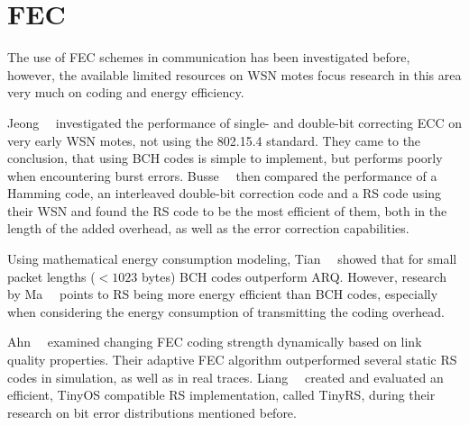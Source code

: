 \section{\acl{FEC}}

The use of \ac{FEC} schemes in communication has been investigated before, however, the available limited resources on \ac{WSN} motes focus research in this area very much on coding and energy efficiency.

Jeong~\etal~\cite{Jeong2003} investigated the performance of single- and double-bit correcting \ac{ECC} on very early \ac{WSN} motes, not using the 802.15.4 standard.
They came to the conclusion, that using \ac{BCH} codes is simple to implement, but performs poorly when encountering burst errors.
Busse~\etal~\cite{Busse2006} then compared the performance of a Hamming code, an interleaved double-bit correction code and a \ac{RS} code using their \ac{WSN} and found the \ac{RS} code to be the most efficient of them, both in the length of the added overhead, as well as the error correction capabilities.

Using mathematical energy consumption modeling, Tian~\etal~\cite{Tian2008} showed that for small packet lengths ($<1023$ bytes) \ac{BCH} codes outperform \ac{ARQ}.
However, research by Ma~\etal~\cite{Ma2009} points to \ac{RS} being more energy efficient than \ac{BCH} codes, especially when considering the energy consumption of transmitting the coding overhead.

Ahn~\etal~\cite{Ahn2005} examined changing \ac{FEC} coding strength dynamically based on link quality properties.
Their adaptive \ac{FEC} algorithm outperformed several static \ac{RS} codes in simulation, as well as in real traces.
Liang~\etal~\cite{Liang2010} created and evaluated an efficient, TinyOS compatible \ac{RS} implementation, called TinyRS, during their research on bit error distributions mentioned before.






